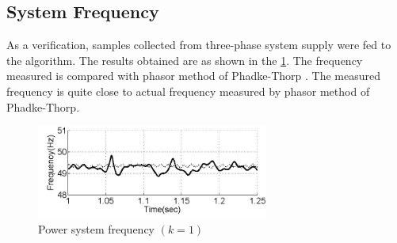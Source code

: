 \subsection{System Frequency}
As a verification, samples collected from three-phase system supply were fed to the algorithm. The results obtained are as shown in the \figurename \ref{system_freq}. The frequency measured is compared with phasor method of Phadke-Thorp \cite{phadkethorp}. The measured frequency is quite close to actual frequency measured by phasor method of Phadke-Thorp.
 \begin{figure}[!t]
 \centering
 \includegraphics[width=3.0in]{system_freq}
 \caption{Power system frequency $(k=1)$}
 \label{system_freq}
 \end{figure}


